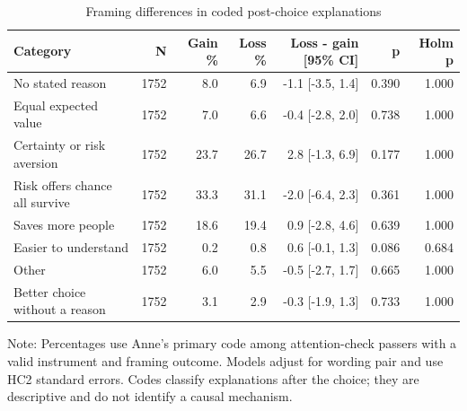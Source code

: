 \begin{table}[H]
\centering
\caption{\label{tab:open-ended-frame-effects}Framing differences in coded post-choice explanations}
\centering
\fontsize{8}{10}\selectfont
\begin{threeparttable}
\begin{tabular}[t]{lrrrrrr}
\toprule
Category & N & Gain \% & Loss \% & Loss - gain [95\% CI] & p & Holm p\\
\midrule
No stated reason & 1752 & 8.0 & 6.9 & -1.1 [-3.5, 1.4] & 0.390 & 1.000\\
Equal expected value & 1752 & 7.0 & 6.6 & -0.4 [-2.8, 2.0] & 0.738 & 1.000\\
Certainty or risk aversion & 1752 & 23.7 & 26.7 & 2.8 [-1.3, 6.9] & 0.177 & 1.000\\
Risk offers chance all survive & 1752 & 33.3 & 31.1 & -2.0 [-6.4, 2.3] & 0.361 & 1.000\\
Saves more people & 1752 & 18.6 & 19.4 & 0.9 [-2.8, 4.6] & 0.639 & 1.000\\
Easier to understand & 1752 & 0.2 & 0.8 & 0.6 [-0.1, 1.3] & 0.086 & 0.684\\
Other & 1752 & 6.0 & 5.5 & -0.5 [-2.7, 1.7] & 0.665 & 1.000\\
Better choice without a reason & 1752 & 3.1 & 2.9 & -0.3 [-1.9, 1.3] & 0.733 & 1.000\\
\bottomrule
\end{tabular}
\begin{tablenotes}[para]
\item Note: Percentages use Anne's primary code among attention-check passers with a valid instrument and framing outcome. Models adjust for wording pair and use HC2 standard errors. Codes classify explanations after the choice; they are descriptive and do not identify a causal mechanism.
\end{tablenotes}
\end{threeparttable}
\end{table}
